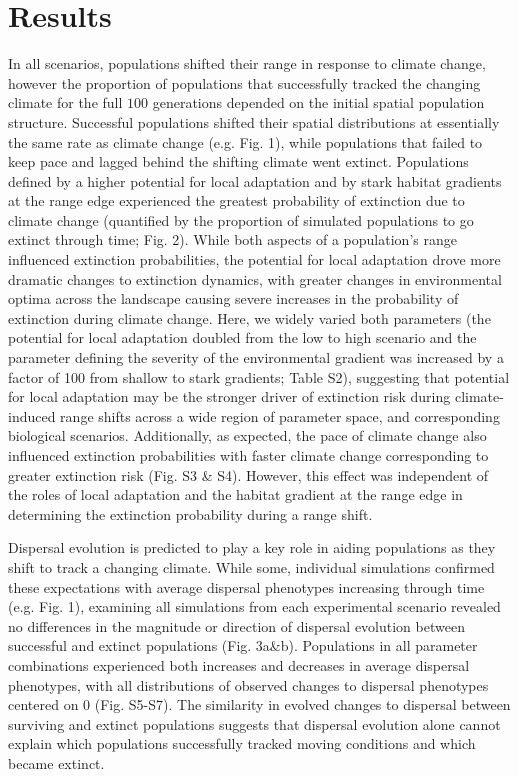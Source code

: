 \documentclass[12pt, oneside]{article}
\begin{document}
\section*{Results}
In all scenarios, populations shifted their range in response to climate change, however the proportion of populations that successfully tracked the changing climate for the full $100$ generations depended on the initial spatial population structure. Successful populations shifted their spatial distributions at essentially the same rate as climate change (e.g. Fig. 1), while populations that failed to keep pace and lagged behind the shifting climate went extinct. Populations defined by a higher potential for local adaptation and by stark habitat gradients at the range edge experienced the greatest probability of extinction due to climate change (quantified by the proportion of simulated populations to go extinct through time; Fig. 2). While both aspects of a population's range influenced extinction probabilities, the potential for local adaptation drove more dramatic changes to extinction dynamics, with greater changes in environmental optima across the landscape causing severe increases in the probability of extinction during climate change. Here, we widely varied both parameters (the potential for local adaptation doubled from the low to high scenario and the parameter defining the severity of the environmental gradient was increased by a factor of 100 from shallow to stark gradients; Table S2), suggesting that potential for local adaptation may be the stronger driver of extinction risk during climate-induced range shifts across a wide region of parameter space, and corresponding biological scenarios. Additionally, as expected, the pace of climate change also influenced extinction probabilities with faster climate change corresponding to greater extinction risk (Fig. S3 \& S4). However, this effect was independent of the roles of local adaptation and the habitat gradient at the range edge in determining the extinction probability during a range shift.

Dispersal evolution is predicted to play a key role in aiding populations as they shift to track a changing climate. While some, individual simulations confirmed these expectations with average dispersal phenotypes increasing through time (e.g. Fig. 1), examining all simulations from each experimental scenario revealed no differences in the magnitude or direction of dispersal evolution between successful and extinct populations (Fig. 3a\&b). Populations in all parameter combinations experienced both increases and decreases in average dispersal phenotypes, with all distributions of observed changes to dispersal phenotypes centered on $0$ (Fig. S5-S7). The similarity in evolved changes to dispersal between surviving and extinct populations suggests that dispersal evolution alone cannot explain which populations successfully tracked moving conditions and which became extinct.
\end{document}
